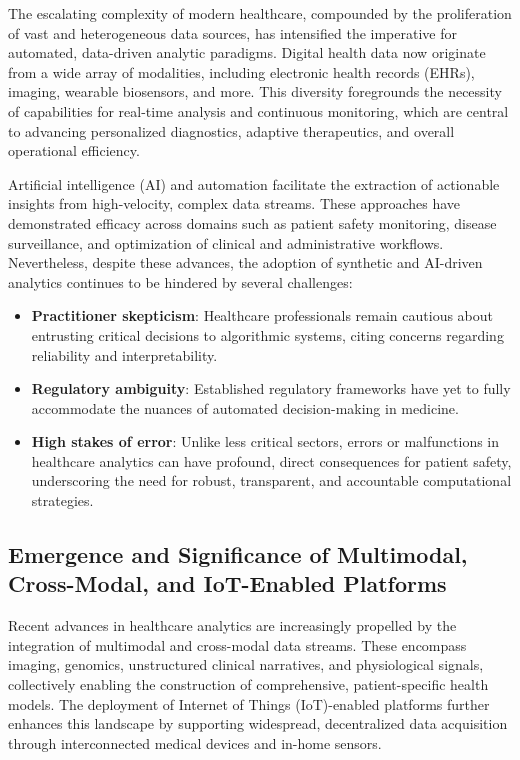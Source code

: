\documentclass[sigconf]{acmart}
\begin{document}
The escalating complexity of modern healthcare, compounded by the proliferation of vast and heterogeneous data sources, has intensified the imperative for automated, data-driven analytic paradigms. Digital health data now originate from a wide array of modalities, including electronic health records (EHRs), imaging, wearable biosensors, and more. This diversity foregrounds the necessity of capabilities for real-time analysis and continuous monitoring, which are central to advancing personalized diagnostics, adaptive therapeutics, and overall operational efficiency.

Artificial intelligence (AI) and automation facilitate the extraction of actionable insights from high-velocity, complex data streams. These approaches have demonstrated efficacy across domains such as patient safety monitoring, disease surveillance, and optimization of clinical and administrative workflows. Nevertheless, despite these advances, the adoption of synthetic and AI-driven analytics continues to be hindered by several challenges:

\begin{itemize}
    \item \textbf{Practitioner skepticism}: Healthcare professionals remain cautious about entrusting critical decisions to algorithmic systems, citing concerns regarding reliability and interpretability.
    \item \textbf{Regulatory ambiguity}: Established regulatory frameworks have yet to fully accommodate the nuances of automated decision-making in medicine.
    \item \textbf{High stakes of error}: Unlike less critical sectors, errors or malfunctions in healthcare analytics can have profound, direct consequences for patient safety, underscoring the need for robust, transparent, and accountable computational strategies.
\end{itemize}

\subsection{Emergence and Significance of Multimodal, Cross-Modal, and IoT-Enabled Platforms}

Recent advances in healthcare analytics are increasingly propelled by the integration of multimodal and cross-modal data streams. These encompass imaging, genomics, unstructured clinical narratives, and physiological signals, collectively enabling the construction of comprehensive, patient-specific health models. The deployment of Internet of Things (IoT)-enabled platforms further enhances this landscape by supporting widespread, decentralized data acquisition through interconnected medical devices and in-home sensors.
\end{document}
